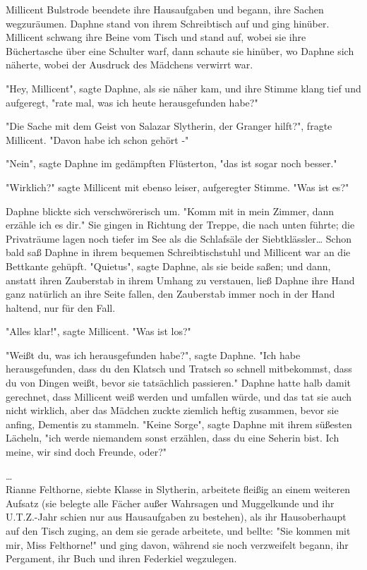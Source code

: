 {Millicent Bulstrode beendete ihre Hausaufgaben und begann, ihre Sachen wegzuräumen. Daphne stand von ihrem Schreibtisch auf und ging hinüber. Millicent schwang ihre Beine vom Tisch und stand auf, wobei sie ihre Büchertasche über eine Schulter warf, dann schaute sie hinüber, wo Daphne sich näherte, wobei der Ausdruck des Mädchens verwirrt war.

"Hey, Millicent", sagte Daphne, als sie näher kam, und ihre Stimme klang tief und aufgeregt, "rate mal, was ich heute herausgefunden habe?"

"Die Sache mit dem Geist von Salazar Slytherin, der Granger hilft?", fragte Millicent. "Davon habe ich schon gehört -"

"Nein", sagte Daphne im gedämpften Flüsterton, "das ist sogar noch besser."

"Wirklich?" sagte Millicent mit ebenso leiser, aufgeregter Stimme. "Was ist es?"

Daphne blickte sich verschwörerisch um. "Komm mit in mein Zimmer, dann erzähle ich es dir." Sie gingen in Richtung der Treppe, die nach unten führte; die Privaträume lagen noch tiefer im See als die Schlafsäle der Siebtklässler… Schon bald saß Daphne in ihrem bequemen Schreibtischstuhl und Millicent war an die Bettkante gehüpft. "Quietus", sagte Daphne, als sie beide saßen; und dann, anstatt ihren Zauberstab in ihrem Umhang zu verstauen, ließ Daphne ihre Hand ganz natürlich an ihre Seite fallen, den Zauberstab immer noch in der Hand haltend, nur für den Fall.

"Alles klar!", sagte Millicent. "Was ist los?"

"Weißt du, was ich herausgefunden habe?", sagte Daphne. "Ich habe herausgefunden, dass du den Klatsch und Tratsch so schnell mitbekommst, dass du von Dingen weißt, bevor sie tatsächlich passieren." Daphne hatte halb damit gerechnet, dass Millicent weiß werden und umfallen würde, und das tat sie auch nicht wirklich, aber das Mädchen zuckte ziemlich heftig zusammen, bevor sie anfing, Dementis zu stammeln. "Keine Sorge", sagte Daphne mit ihrem süßesten Lächeln, "ich werde niemandem sonst erzählen, dass du eine Seherin bist. Ich meine, wir sind doch Freunde, oder?"

…\\ Rianne Felthorne, siebte Klasse in Slytherin, arbeitete fleißig an einem weiteren Aufsatz (sie belegte alle Fächer außer Wahrsagen und Muggelkunde und ihr U.T.Z.-Jahr schien nur aus Hausaufgaben zu bestehen), als ihr Hausoberhaupt auf den Tisch zuging, an dem sie gerade arbeitete, und bellte: "Sie kommen mit mir, Miss Felthorne!" und ging davon, während sie noch verzweifelt begann, ihr Pergament, ihr Buch und ihren Federkiel wegzulegen.

}
